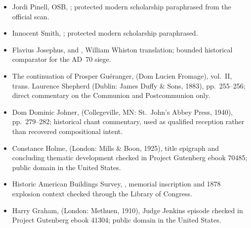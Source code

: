 {\begin{itemize}[itemsep=0em,topsep=0.15em,parsep=0pt]
\item Jordi Pinell, OSB, ; protected modern scholarship paraphrased from the official scan.
\fi
\ifdefined\TriptychSynthesisEdition\else
\item Innocent Smith, ; protected modern scholarship paraphrased.
\fi
\ifdefined\TriptychSynthesisEdition\else
\item Flavius Josephus,  and , William Whiston translation; bounded historical comparator for the AD~70 siege.
\fi
\item The continuation of Prosper Guéranger,  (Dom Lucien Fromage), vol.~II, trans. Laurence Shepherd (Dublin: James Duffy \& Sons, 1883), pp.~255--256; direct commentary on the Communion and Postcommunion only.
\item Dom Dominic Johner,  (Collegeville, MN: St.~John's Abbey Press, 1940), pp.~279--282; historical chant commentary, used as qualified reception rather than recovered compositional intent.
\item Constance Holme,  (London: Mills \& Boon, 1925), title epigraph and concluding thematic development checked in Project Gutenberg ebook 70485; public domain in the United States.
\item Historic American Buildings Survey, , memorial inscription and 1878 explosion context checked through the Library of Congress.
\item Harry Graham,  (London: Methuen, 1910), Judge Jenkins episode checked in Project Gutenberg ebook 41304; public domain in the United States.
\end{itemize}
}

\ifdefined\TriptychSynthesisEdition\else\enlargethispage{3\baselineskip}\fi
\par\vspace{0pt}
\vspace{0pt}
